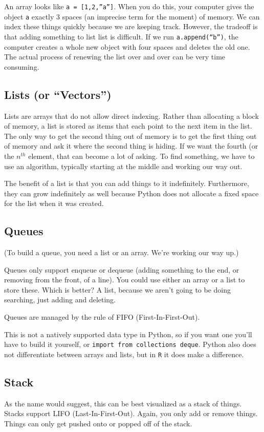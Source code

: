 \documentclass[12pt,letter]{article}
\begin{document}
An array looks like \texttt{a = [1,2,''a'']}. When you do this, your
computer gives the object \texttt{a} exactly 3 spaces (an imprecise
term for the moment) of memory. We can index these things quickly
because we are keeping track. However, the tradeoff is that adding
something to list list is difficult. If we run
\texttt{a.append(``b'')}, the computer creates a whole new object with
four spaces and deletes the old one. The actual process of renewing
the list over and over can be very time consuming. 

\subsection{Lists (or ``Vectors'')}
Lists are arrays that do not allow direct indexing. Rather than
allocating a block of memory, a list is stored as items that each
point to the next item in the list. The only way to get the second
thing out of memory is to get the first thing out of memory and ask it
where the second thing is hiding. If we want the fourth (or the
$n^{th}$ element, that can become a lot of asking. To find something,
we have to use an algorithm, typically starting at the middle and
working our way out. 

The benefit of a list is that you can add things to it
indefinitely. Furthermore, they can grow indefinitely as well because
Python does not allocate a fixed space for the list when it was
created. 

\subsection{Queues}
(To build a queue, you need a list or an array. We're working our way
up.)

Queues only support enqueue or dequeue (adding something to the end,
or removing from the front, of a line). You could use either an array
or a list to store these. Which is better? A list, because we aren't
going to be doing searching, just adding and deleting. 

Queues are managed by the rule of FIFO (First-In-First-Out).

This is not a natively supported data type in Python, so if you want
one you'll have to build it yourself, or \texttt{import from
  collections deque}. Python also does not differentiate between arrays and
lists, but in \texttt{R} it does make a difference. 

\subsection{Stack}
As the name would suggest, this can be best visualized as a stack of
things. Stacks support LIFO (Last-In-First-Out). Again, you only add
or remove things. Things can only get pushed onto or popped off of the stack. 
\end{document}
